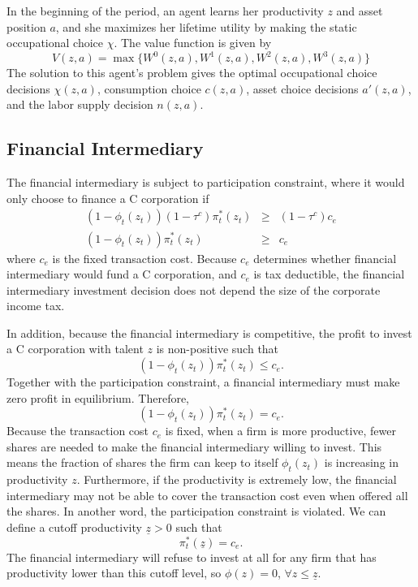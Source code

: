 \documentclass[12pt]{article}
\begin{document}
In the beginning of the period, an agent learns her productivity $z$ and asset position $a$, and she maximizes her lifetime utility by making the static occupational choice $\chi$. The value function is given by
\begin{equation}
V(z,a)=\max\{ W^0(z,a), W^1(z,a), W^2(z,a), W^3(z,a)\}\label{eqn:VW}
\end{equation}
The solution to this agent's problem gives the optimal occupational choice decisions $\chi(z,a)$, consumption choice $c(z,a)$, asset choice decisions $a'(z,a)$, and the labor supply decision $n(z,a)$. 

\subsection{Financial Intermediary}
The financial intermediary is subject to participation
constraint, where it would only choose to finance a C corporation if 
\begin{eqnarray*}
(1-\phi_t(z_t))(1-\tau^c)\pi^*_t(z_t)&\geq& (1-\tau^c) c_e\\
(1-\phi_t(z_t))\pi^*_t(z_t)&\geq& c_e
\end{eqnarray*}
where $c_e$ is the fixed transaction cost. Because $c_e$ determines whether financial intermediary would fund a C corporation, and $c_e$ is tax deductible, the financial intermediary investment decision does not depend the size of the corporate income tax.

In addition, because the financial intermediary is competitive, the profit to invest a C corporation with talent $z$ is non-positive such that
\begin{equation*}
(1-\phi_t(z_t))\pi^*_t(z_t)\leq c_e.
\end{equation*}
Together with the participation constraint, a financial intermediary must make zero
profit in equilibrium. Therefore,
\begin{equation}
(1-\phi_t(z_t))\pi_t^*(z_t) = c_e. \label{eqn:phi}
\end{equation}
Because the transaction cost $c_e$ is fixed, when a firm is more productive, fewer shares are needed to make the financial intermediary willing to invest. This means the fraction of shares the firm can keep to itself $\phi_t(z_t)$ is increasing in productivity $z$. Furthermore, if the productivity is extremely low, the financial intermediary may not be able to cover the transaction cost even when offered all the shares. In another word, the participation constraint is violated. We can define a cutoff productivity $\underline{z}>0$ such that 
\begin{equation*}
\pi_t^*(\underline{z}) = c_e.
\end{equation*}
The financial intermediary will refuse to invest at all for any firm that has productivity lower than this cutoff level, so $\phi(z)=0$, $\forall z\leq\underline{z}$.
\end{document}
